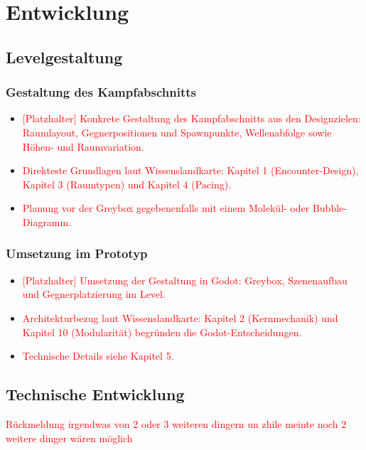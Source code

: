 \documentclass[../Main.tex]{subfiles}
\begin{document}
\section{Entwicklung} \label{sec:Entwicklung}

\subsection{Levelgestaltung} \label{sec:Levelgestaltung}

\subsubsection{Gestaltung des Kampfabschnitts}

\begin{itemize}[leftmargin=1.5cm]
    \item \textcolor{red}{[Platzhalter] Konkrete Gestaltung des Kampfabschnitts aus den Designzielen: Raumlayout, Gegnerpositionen und Spawnpunkte, Wellenabfolge sowie Höhen- und Raumvariation.}
    \item \textcolor{red}{Direkteste Grundlagen laut Wissenslandkarte: Kapitel 1 (Encounter-Design), Kapitel 3 (Raumtypen) und Kapitel 4 (Pacing).}
    \item \textcolor{red}{Planung vor der Greybox gegebenenfalls mit einem Molekül- oder Bubble-Diagramm.}
\end{itemize}

\subsubsection{Umsetzung im Prototyp}

\begin{itemize}[leftmargin=1.5cm]
    \item \textcolor{red}{[Platzhalter] Umsetzung der Gestaltung in Godot: Greybox, Szenenaufbau und Gegnerplatzierung im Level.}
    \item \textcolor{red}{Architekturbezug laut Wissenslandkarte: Kapitel 2 (Kernmechanik) und Kapitel 10 (Modularität) begründen die Godot-Entscheidungen.}
    \item \textcolor{red}{Technische Details siehe Kapitel 5.}
\end{itemize}

\subsection{Technische Entwicklung}
\textcolor{red}{Rückmeldung irgendwas von 2 oder 3 weiteren dingern un zhile meinte noch 2 weitere dinger wären möglich}
\end{document}
